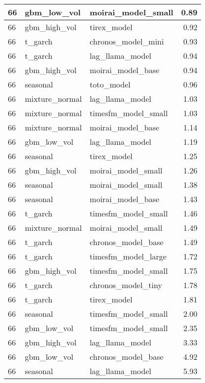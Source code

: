 {\begin{tabular}{lllr}
\midrule
66 & gbm\_low\_vol & moirai\_model\_small & 0.89 \\
\midrule
66 & gbm\_high\_vol & tirex\_model & 0.92 \\
\midrule
66 & t\_garch & chronos\_model\_mini & 0.93 \\
\midrule
66 & t\_garch & lag\_llama\_model & 0.94 \\
\midrule
66 & gbm\_high\_vol & moirai\_model\_base & 0.94 \\
\midrule
66 & seasonal & toto\_model & 0.96 \\
\midrule
66 & mixture\_normal & lag\_llama\_model & 1.03 \\
\midrule
66 & mixture\_normal & timesfm\_model\_small & 1.03 \\
\midrule
66 & mixture\_normal & moirai\_model\_base & 1.14 \\
\midrule
66 & gbm\_low\_vol & lag\_llama\_model & 1.19 \\
\midrule
66 & seasonal & tirex\_model & 1.25 \\
\midrule
66 & gbm\_high\_vol & moirai\_model\_small & 1.26 \\
\midrule
66 & seasonal & moirai\_model\_small & 1.38 \\
\midrule
66 & seasonal & moirai\_model\_base & 1.43 \\
\midrule
66 & t\_garch & timesfm\_model\_small & 1.46 \\
\midrule
66 & mixture\_normal & moirai\_model\_small & 1.49 \\
\midrule
66 & t\_garch & chronos\_model\_base & 1.49 \\
\midrule
66 & t\_garch & timesfm\_model\_large & 1.72 \\
\midrule
66 & gbm\_high\_vol & timesfm\_model\_small & 1.75 \\
\midrule
66 & t\_garch & chronos\_model\_tiny & 1.78 \\
\midrule
66 & t\_garch & tirex\_model & 1.81 \\
\midrule
66 & seasonal & timesfm\_model\_small & 2.00 \\
\midrule
66 & gbm\_low\_vol & timesfm\_model\_small & 2.35 \\
\midrule
66 & gbm\_high\_vol & lag\_llama\_model & 3.33 \\
\midrule
66 & gbm\_low\_vol & chronos\_model\_base & 4.92 \\
\midrule
66 & seasonal & lag\_llama\_model & 5.93 \\
\bottomrule
\end{tabular}
}